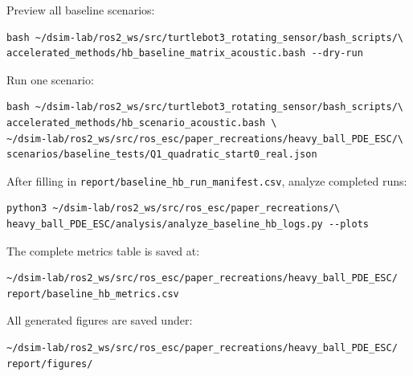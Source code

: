 \documentclass[11pt]{article}
\begin{document}
Preview all baseline scenarios:
\begin{verbatim}
bash ~/dsim-lab/ros2_ws/src/turtlebot3_rotating_sensor/bash_scripts/\
accelerated_methods/hb_baseline_matrix_acoustic.bash --dry-run
\end{verbatim}

Run one scenario:
\begin{verbatim}
bash ~/dsim-lab/ros2_ws/src/turtlebot3_rotating_sensor/bash_scripts/\
accelerated_methods/hb_scenario_acoustic.bash \
~/dsim-lab/ros2_ws/src/ros_esc/paper_recreations/heavy_ball_PDE_ESC/\
scenarios/baseline_tests/Q1_quadratic_start0_real.json
\end{verbatim}

After filling in \texttt{report/baseline\_hb\_run\_manifest.csv}, analyze
completed runs:
\begin{verbatim}
python3 ~/dsim-lab/ros2_ws/src/ros_esc/paper_recreations/\
heavy_ball_PDE_ESC/analysis/analyze_baseline_hb_logs.py --plots
\end{verbatim}

The complete metrics table is saved at:
\begin{verbatim}
~/dsim-lab/ros2_ws/src/ros_esc/paper_recreations/heavy_ball_PDE_ESC/
report/baseline_hb_metrics.csv
\end{verbatim}

All generated figures are saved under:
\begin{verbatim}
~/dsim-lab/ros2_ws/src/ros_esc/paper_recreations/heavy_ball_PDE_ESC/
report/figures/
\end{verbatim}
\end{document}
